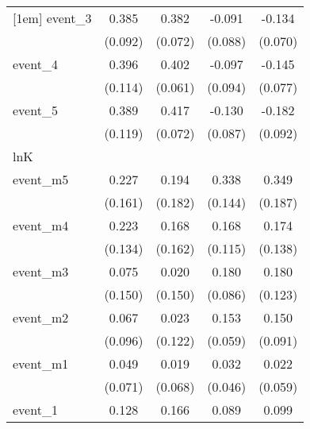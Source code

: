 {\begin{tabular}{l*{4}{c}}
[1em]
event\_3     &       0.385\sym{***}&       0.382\sym{***}&      -0.091         &      -0.134         \\
            &     (0.092)         &     (0.072)         &     (0.088)         &     (0.070)         \\
[1em]
event\_4     &       0.396\sym{***}&       0.402\sym{***}&      -0.097         &      -0.145         \\
            &     (0.114)         &     (0.061)         &     (0.094)         &     (0.077)         \\
[1em]
event\_5     &       0.389\sym{**} &       0.417\sym{***}&      -0.130         &      -0.182\sym{*}  \\
            &     (0.119)         &     (0.072)         &     (0.087)         &     (0.092)         \\
\hline
lnK         &                     &                     &                     &                     \\
event\_m5    &       0.227         &       0.194         &       0.338\sym{*}  &       0.349         \\
            &     (0.161)         &     (0.182)         &     (0.144)         &     (0.187)         \\
[1em]
event\_m4    &       0.223         &       0.168         &       0.168         &       0.174         \\
            &     (0.134)         &     (0.162)         &     (0.115)         &     (0.138)         \\
[1em]
event\_m3    &       0.075         &       0.020         &       0.180\sym{*}  &       0.180         \\
            &     (0.150)         &     (0.150)         &     (0.086)         &     (0.123)         \\
[1em]
event\_m2    &       0.067         &       0.023         &       0.153\sym{**} &       0.150         \\
            &     (0.096)         &     (0.122)         &     (0.059)         &     (0.091)         \\
[1em]
event\_m1    &       0.049         &       0.019         &       0.032         &       0.022         \\
            &     (0.071)         &     (0.068)         &     (0.046)         &     (0.059)         \\
[1em]
event\_1     &       0.128\sym{*}  &       0.166\sym{***}&       0.089         &       0.099         \\

\end{tabular}}
